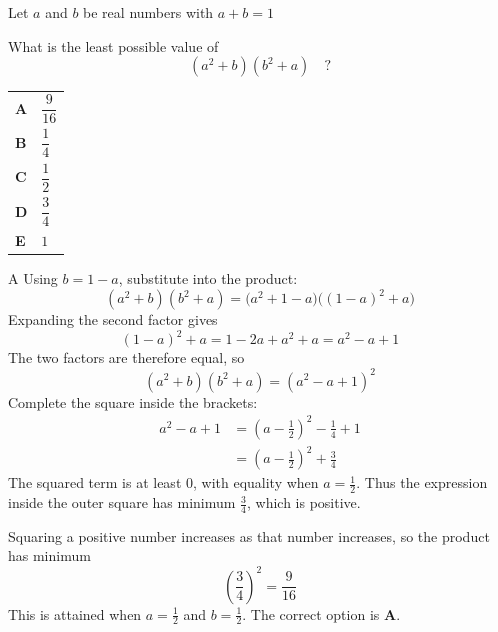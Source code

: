 \documentclass[11pt,a4paper]{article}
\begin{document}
\begin{enumerate}[label=\textbf{\arabic*.},leftmargin=*,itemsep=0pt,start=18]
\questionitem[Algebra]
Let $a$ and $b$ be real numbers with $a+b=1$

What is the least possible value of \[(a^2 + b)(b^2 + a)\quad?\]

\par\vspace*{12pt}
\begin{tabularx}{\linewidth}{@{}>{\bfseries}l Y@{}}
A &
$\dfrac{9}{16}$
\\[0.8em]
B &
$\dfrac{1}{4}$
\\[0.8em]
C &
$\dfrac{1}{2}$
\\[0.8em]
D &
$\dfrac{3}{4}$
\\[0.8em]
E &
$1$
\\
\end{tabularx}

\begin{djsSolution}{A}
Using $b=1-a$, substitute into the product:
\[
(a^2+b)(b^2+a)=\bigl(a^2+1-a\bigr)\bigl((1-a)^2+a\bigr)
\]
Expanding the second factor gives
\[
(1-a)^2+a=1-2a+a^2+a=a^2-a+1
\]
The two factors are therefore equal, so
\[
(a^2+b)(b^2+a)=(a^2-a+1)^2
\]
Complete the square inside the brackets:
\[
\begin{aligned}
a^2-a+1
&=\left(a-\frac12\right)^2-\frac14+1\\[8pt]
&=\left(a-\frac12\right)^2+\frac34
\end{aligned}
\]
The squared term is at least $0$, with equality when $a=\frac12$. Thus the expression inside the outer square has minimum $\frac34$, which is positive. 

Squaring a positive number increases as that number increases, so the product has minimum
\[
\left(\frac34\right)^2=\frac{9}{16}
\]
This is attained when $a=\frac12$ and $b=\frac12$. The correct option is \textbf{A}.
\end{djsSolution}
\end{enumerate}
\clearpage
\thispagestyle{djssolutions}
\vspace*{8pt}
\end{document}
